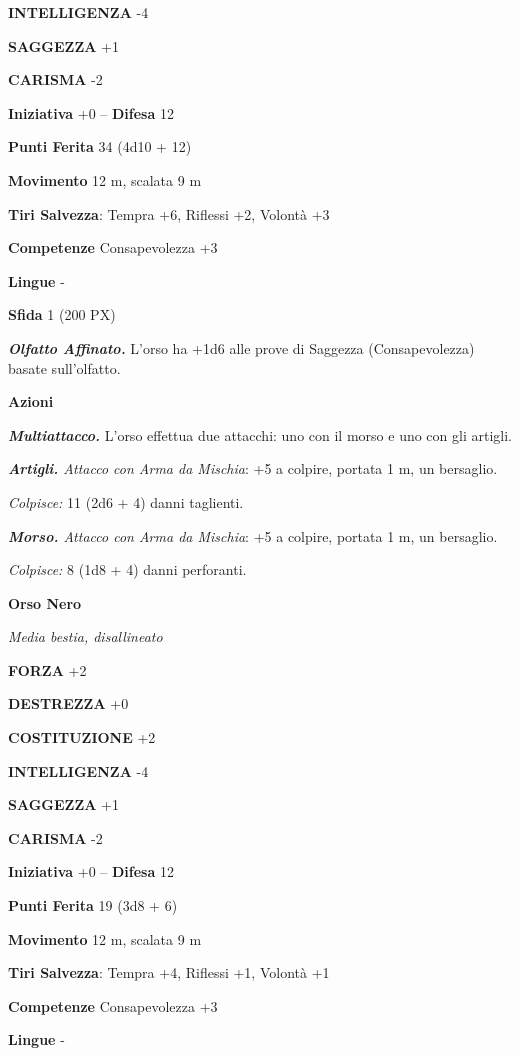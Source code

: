 \begin{multicols}{2}
	\textbf{INTELLIGENZA} -4

	\textbf{SAGGEZZA} +1

	\textbf{CARISMA} -2

	\textbf{Iniziativa} +0 -- \textbf{Difesa} 12

	\textbf{Punti Ferita} 34 (4d10 + 12)

	\textbf{Movimento} 12 m, scalata 9 m

	\textbf{Tiri Salvezza}: Tempra +6, Riflessi +2, Volontà +3

	\textbf{Competenze} Consapevolezza +3

	\textbf{Lingue} -

	\textbf{Sfida} 1 (200 PX)

	\textit{\textbf{Olfatto Affinato.}} L'orso ha +1d6 alle prove di Saggezza (Consapevolezza) basate sull'olfatto.

	\textbf{Azioni}

	\textit{\textbf{Multiattacco.}} L'orso effettua due attacchi: uno con il morso e uno con gli artigli.

	\textit{\textbf{Artigli.} Attacco con Arma da Mischia}: +5 a colpire, portata 1 m, un bersaglio.

	\textit{Colpisce:} 11 (2d6 + 4) danni taglienti.

	\textit{\textbf{Morso.} Attacco con Arma da Mischia}: +5 a colpire, portata 1 m, un bersaglio.

	\textit{Colpisce:} 8 (1d8 + 4) danni perforanti.

	\medskip\textbf{Orso Nero}

	\textit{Media bestia, disallineato}

	\textbf{FORZA} +2

	\textbf{DESTREZZA} +0

	\textbf{COSTITUZIONE} +2

	\textbf{INTELLIGENZA} -4

	\textbf{SAGGEZZA} +1

	\textbf{CARISMA} -2

	\textbf{Iniziativa} +0 -- \textbf{Difesa} 12

	\textbf{Punti Ferita} 19 (3d8 + 6)

	\textbf{Movimento} 12 m, scalata 9 m

	\textbf{Tiri Salvezza}: Tempra +4, Riflessi +1, Volontà +1

	\textbf{Competenze} Consapevolezza +3

	\textbf{Lingue} -


\end{multicols}
